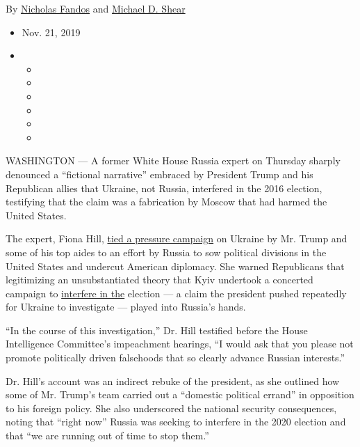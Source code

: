 By \href{https://www.nytimes3xbfgragh.onion/by/nicholas-fandos}{Nicholas
Fandos} and
\href{https://www.nytimes3xbfgragh.onion/by/michael-d-shear}{Michael D.
Shear}

\begin{itemize}
\item
  Nov. 21, 2019
\item
  \begin{itemize}
  \item
  \item
  \item
  \item
  \item
  \item
  \end{itemize}
\end{itemize}

WASHINGTON --- A former White House Russia expert on Thursday sharply
denounced a ``fictional narrative'' embraced by President Trump and his
Republican allies that Ukraine, not Russia, interfered in the 2016
election, testifying that the claim was a fabrication by Moscow that had
harmed the United States.

The expert, Fiona Hill,
\href{https://www.nytimes3xbfgragh.onion/2019/11/21/us/politics/impeachment-hearing.html}{tied
a pressure campaign} on Ukraine by Mr. Trump and some of his top aides
to an effort by Russia to sow political divisions in the United States
and undercut American diplomacy. She warned Republicans that
legitimizing an unsubstantiated theory that Kyiv undertook a concerted
campaign to
\href{https://www.nytimes3xbfgragh.onion/interactive/2018/07/16/us/elections/russian-interference-statements-comments.html}{interfere
in the} election --- a claim the president pushed repeatedly for Ukraine
to investigate --- played into Russia's hands.

``In the course of this investigation,'' Dr. Hill testified before the
House Intelligence Committee's impeachment hearings, ``I would ask that
you please not promote politically driven falsehoods that so clearly
advance Russian interests.''

Dr. Hill's account was an indirect rebuke of the president, as she
outlined how some of Mr. Trump's team carried out a ``domestic political
errand'' in opposition to his foreign policy. She also underscored the
national security consequences, noting that ``right now'' Russia was
seeking to interfere in the 2020 election and that ``we are running out
of time to stop them.''

